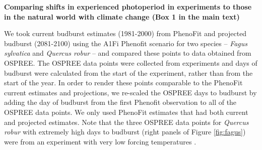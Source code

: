 \documentclass{article}
\begin{document}
\par \textbf{Comparing shifts in experienced photoperiod in experiments to those in the natural world with climate change (Box 1 in the main text)}
\par We took current budburst estimates (1981-2000) from PhenoFit \citep{duputie2015} and projected budburst (2081-2100) using the A1Fi Phenofit scenario for two species -- \textit{Fagus sylvatica} and \textit{Quercus robur} -- and compared these points to data obtained from OSPREE. The OSPREE data points were collected from experiments and days of budburst were calculated from the start of the experiment, rather than from the start of the year. In order to render these points comparable to the PhenoFit current estimates and projections, we re-scaled the OSPREE days to budburst by adding the day of budburst from the first Phenofit observation to all of the OSPREE data points. We only used PhenoFit estimates that had both current and projected estimates. Note that the three OSPREE data points for \textit{Quercus robur} with extremely high days to budburst (right panels of Figure \ref{fig:fagus}) were from an experiment with very low forcing temperatures \citep[][3.8-5.7$^{\circ}$]{Morin:2010aa}. 


\clearpage
\end{document}
